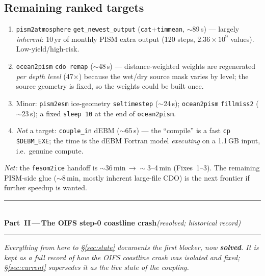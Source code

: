 \documentclass[11pt,a4paper]{article}
\newcommand{\code}[1]{\texttt{\small #1}}
\begin{document}
\subsection{Remaining ranked targets}
\begin{enumerate}[leftmargin=1.6em,itemsep=2pt]
  \item \code{pism2atmosphere} \code{get\_newest\_output} (\code{cat}+\code{timmean}, $\sim$89\,s)
        --- largely \emph{inherent}: 10\,yr of monthly PISM extra output (120 steps,
        $2.36\times10^9$ values). Low-yield/high-risk.
  \item \code{ocean2pism} \code{cdo remap} ($\sim$48\,s) --- distance-weighted weights are
        regenerated \emph{per depth level} (47$\times$) because the wet/dry source mask varies by
        level; the source geometry is fixed, so the weights could be built once.
  \item Minor: \code{pism2esm} ice-geometry \code{seltimestep} ($\sim$24\,s); \code{ocean2pism}
        \code{fillmiss2} ($\sim$23\,s); a fixed \code{sleep 10} at the end of \code{ocean2pism}.
  \item \emph{Not} a target: \code{couple\_in} dEBM ($\sim$65\,s) --- the ``compile'' is a fast
        \code{cp \$DEBM\_EXE}; the time is the dEBM Fortran model \emph{executing} on a 1.1\,GB
        input, i.e.\ genuine compute.
\end{enumerate}
\emph{Net:} the \code{fesom2ice} handoff is $\sim$36\,min\,$\to\sim$3--4\,min (Fixes~1--3).
The remaining PISM-side glue ($\sim$8\,min, mostly inherent large-file CDO) is the next frontier
if further speedup is wanted.

\bigskip
\begin{center}
\rule{0.92\linewidth}{0.4pt}\\[4pt]
{\large\bfseries Part~II\,---\,The OIFS step-0 coastline crash}\;\;\emph{\normalfont(resolved; historical record)}\\[4pt]
\rule{0.92\linewidth}{0.4pt}
\end{center}
\noindent\emph{Everything from here to \S\ref{sec:state} documents the first blocker, now
\textbf{solved}. It is kept as a full record of how the OIFS coastline crash was isolated and
fixed; \S\ref{sec:current} supersedes it as the live state of the coupling.}
\end{document}
